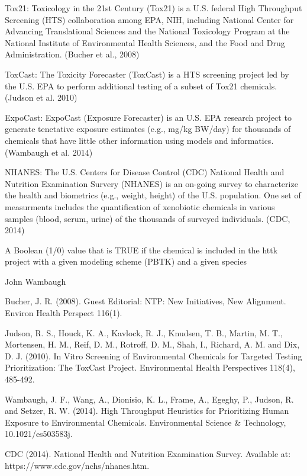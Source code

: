 \documentclass[a4paper]{book}
\begin{document}
%
\begin{Details}\relax
Tox21: Toxicology in the 21st Century (Tox21) is a U.S. federal High
Throughput Screening (HTS) collaboration among EPA, NIH, including National
Center for Advancing Translational Sciences and the National Toxicology
Program at the National Institute of Environmental Health Sciences, and the
Food and Drug Administration.  (Bucher et al., 2008)

ToxCast: The Toxicity Forecaster (ToxCast) is a HTS screening project led by
the U.S. EPA to perform additional testing of a subset of Tox21 chemicals.
(Judson et al. 2010)

ExpoCast: ExpoCast (Exposure Forecaster) is an U.S. EPA research project to
generate tenetative exposure estimates (e.g., mg/kg BW/day) for thousands of
chemicals that have little other information using models and informatics.
(Wambaugh et al. 2014)

NHANES: The U.S. Centers for Disease Control (CDC) National Health and
Nutrition Examination Survery (NHANES) is an on-going survey to characterize
the health and biometrics (e.g., weight, height) of the U.S. population. One
set of measurments includes the quantification of xenobiotic chemicals in
various samples (blood, serum, urine) of the thousands of surveyed
individuals. (CDC, 2014)
\end{Details}
%
\begin{Value}
\begin{ldescription}
\item[\code{logical}] A Boolean (1/0) value that is TRUE if the chemical
is included in the httk project with a given modeling scheme (PBTK) and 
a given species
\end{ldescription}
\end{Value}
%
\begin{Author}\relax
John Wambaugh
\end{Author}
%
\begin{References}\relax
Bucher, J. R. (2008). Guest Editorial: NTP: New Initiatives, New
Alignment. Environ Health Perspect 116(1).

Judson, R. S., Houck, K. A., Kavlock, R. J., Knudsen, T. B., Martin, M. T.,
Mortensen, H. M., Reif, D. M., Rotroff, D. M., Shah, I., Richard, A. M. and
Dix, D. J. (2010). In Vitro Screening of Environmental Chemicals for
Targeted Testing Prioritization: The ToxCast Project. Environmental Health
Perspectives 118(4), 485-492.

Wambaugh, J. F., Wang, A., Dionisio, K. L., Frame, A., Egeghy, P., Judson,
R. and Setzer, R. W. (2014). High Throughput Heuristics for Prioritizing
Human Exposure to Environmental Chemicals. Environmental Science \&
Technology, 10.1021/es503583j.

CDC (2014). National Health and Nutrition Examination Survey. Available at:
https://www.cdc.gov/nchs/nhanes.htm.
\end{References}
\end{document}
